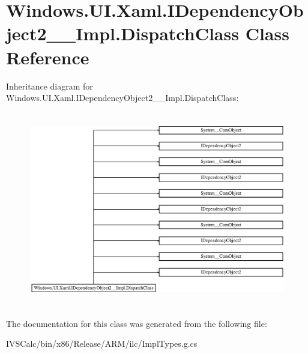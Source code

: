 \hypertarget{class_windows_1_1_u_i_1_1_xaml_1_1_i_dependency_object2_____impl_1_1_dispatch_class}{}\section{Windows.\+U\+I.\+Xaml.\+I\+Dependency\+Object2\+\_\+\+\_\+\+Impl.\+Dispatch\+Class Class Reference}
\label{class_windows_1_1_u_i_1_1_xaml_1_1_i_dependency_object2_____impl_1_1_dispatch_class}
Inheritance diagram for Windows.\+U\+I.\+Xaml.\+I\+Dependency\+Object2\+\_\+\+\_\+\+Impl.\+Dispatch\+Class\+:\begin{figure}[H]
\begin{center}
\leavevmode
\includegraphics[height=8.555555cm]{class_windows_1_1_u_i_1_1_xaml_1_1_i_dependency_object2_____impl_1_1_dispatch_class}
\end{center}
\end{figure}


The documentation for this class was generated from the following file\+:\begin{DoxyCompactItemize}
\item 
I\+V\+S\+Calc/bin/x86/\+Release/\+A\+R\+M/ilc/Impl\+Types.\+g.\+cs\end{DoxyCompactItemize}
